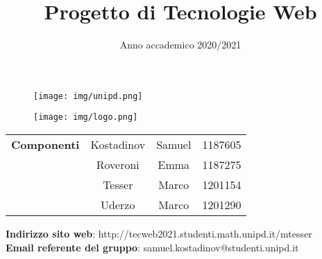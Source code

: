 
\title{Progetto di Tecnologie Web}
\date{Anno accademico 2020/2021}


\maketitle
\begin{figure}[H]
	\centering
	\texttt{[image: img/unipd.png]}
\end{figure}
\begin{figure}[H]
	\centering
	\texttt{[image: img/logo.png]}
\end{figure}
\begin{table}[H]
	\centering
	\begin{tabular}{c|c c c}
		\textbf{Componenti} & Kostadinov     & Samuel  & 1187605 \\
		                    & Roveroni       & Emma    & 1187275 \\
		                    & Tesser         & Marco   & 1201154 \\
		                    & Uderzo         & Marco   & 1201290 \\
	\end{tabular}
\end{table}

\begin{center}
	\textbf{Indirizzo sito web}: http://tecweb2021.studenti.math.unipd.it/mtesser\\
	\textbf{Email referente del gruppo}: samuel.kostadinov@studenti.unipd.it
\end{center}


